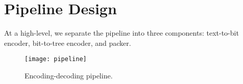 \section[design]{Pipeline Design}

At a high-level, we separate the pipeline into three components: text-to-bit encoder, bit-to-tree encoder, and packer.

\begin{figure}[h]
    \caption{Encoding-decoding pipeline.}
    \centering
    \texttt{[image: pipeline]}
\end{figure}